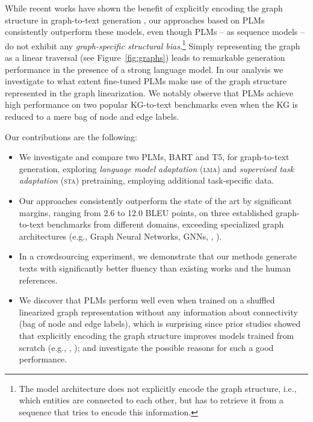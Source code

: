 \documentclass[11pt]{article}
\begin{document}
While recent works have shown the benefit of explicitly encoding the graph structure in graph-to-text generation \cite[][to name a few]{song-etal-acl2018, ribeiro-etal-2019-enhancing, ribeiro-etal-2020-modeling,schmitt2020modeling, zhao-etal-2020-bridging}, our approaches based on PLMs consistently outperform these models, even though PLMs -- as sequence models -- do not exhibit any \emph{graph-specific structural bias}.\footnote{The model architecture does not explicitly encode the graph structure, i.e., which entities are connected to each other, but has to retrieve it from a sequence that tries to encode this information.} Simply representing the graph as a linear traversal (see Figure~\ref{fig:graphs}) leads to remarkable generation performance in the presence of a strong language model.
In our analysis
we investigate to what extent fine-tuned PLMs make use of the graph structure represented in the graph linearization.
We notably observe that PLMs achieve high performance on two popular KG-to-text benchmarks even when the KG is reduced to a mere bag of node and edge labels.


Our contributions are the following:
\begin{itemize}[noitemsep,nolistsep]
    \item We investigate and compare two PLMs, BART and T5, for graph-to-text generation, exploring \emph{language model adaptation} (\textsc{lma}) and \emph{supervised task adaptation} (\textsc{sta}) pretraining, employing additional task-specific data.\item Our approaches consistently outperform the state of the art by significant margins, ranging from 2.6 to 12.0 BLEU points, on three established graph-to-text benchmarks from different domains, exceeding specialized graph architectures (e.g., Graph Neural Networks, GNNs, \citeauthor{Kipf:2016tc}, \citeyear{Kipf:2016tc}).
    \item In a crowdsourcing experiment, we demonstrate that our methods generate texts with significantly better fluency than existing works and the human references.
    \item We discover that PLMs perform well even when trained on a shuffled linearized graph representation without any information about connectivity (bag of node and edge labels), which is surprising since prior studies showed that explicitly encoding the graph structure improves models trained from scratch (e.g., \citeauthor{zhao-etal-2020-bridging}, \citeyear{zhao-etal-2020-bridging}); and investigate the possible reasons for such a good performance.




\end{itemize}
\end{document}

